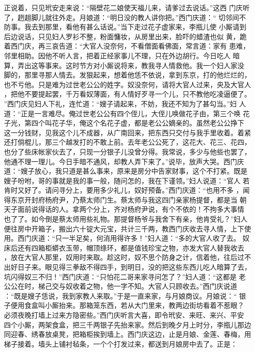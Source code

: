 正说着，只见玳安走来说：“隔壁花二娘使天福儿来，请爹过去说话。”这西
门庆听了，趔趄脚儿就往外走。月娘道：“明日没的教人讲你把。”西门庆道：“
切邻间不防事。我去到那里，看他有甚么话说。”当下走过花子虚家来，李瓶儿使
小厮请到后边说话，只见妇人罗衫不整，粉面慵妆，从房里出来，脸吓的蜡渣也似
黄，跪着西门庆，再三哀告道：“大官人没奈何，不看僧面看佛面，常言道：家有
患难，邻里相助。因他不听人言，把着正经家事儿不理，只在外边胡行。今日吃人
暗算，弄出这等事来。这时节方对小厮说将来，教我寻人情救他。我一个妇人家没
脚的，那里寻那人情去。发狠起来，想着他恁不依说，拿到东京，打的他烂烂的，
也不亏他。只是难为过世老公公的姓字。奴没奈何，请将大官人过来，央及大官人
，把他不要提起罢，千万看奴薄面，有人情好歹寻一个儿，只不教他吃凌逼便了。
”西门庆见妇人下礼，连忙道：“嫂子请起来，不妨，我还不知为了甚勾当。”妇
人道：“正是一言难尽。俺过世老公公有四个侄儿，大侄儿唤做花子由，第三个唤
花子光，第四个叫花子华，俺这个名花子虚，都是老公公嫡亲的。虽然老公公挣下
这一分钱财，见我这个儿不成器，从广南回来，把东西只交付与我手里收着。着紧
还打倘棍儿，那三个越发打的不敢上前。去年老公公死了，这花大、花三、花四，
也分了些床帐家伙去了，只现一分银子儿没曾分得。我常说，多少与他些也罢了，
他通不理一理儿。今日手暗不通风，却教人弄下来了。”说毕，放声大哭。西门庆
道：“嫂子放心，我只道是甚么事来，原来是房分中告家财事，这个不打紧。既是
嫂子吩咐，哥的事就是我的事一般，随问怎的，我在下谨领。”妇人说道：“官人
若肯时又好了。请问寻分上，要用多少礼儿，奴好预备。”西门庆道：“也用不多
，闻得东京开封府杨府尹，乃蔡太师门生。蔡太师与我这四门亲家杨提督，都是当
朝天子面前说得话的人。拿两个分上，齐对杨府尹说，有个不依的！不拘多大事情
也了了。如今倒是蔡太师用些礼物。那提督杨爷与我舍下有亲，他肯受礼？”妇人
便往房中开箱子，搬出六十锭大元宝，共计三千两，教西门庆收去寻人情，上下使
用。西门庆道：“只一半足矣，何消用得许多！”妇人道：“多的大官人收了去。
奴床后还有四箱柜蟒衣玉带，帽顶绦环，都是值钱珍宝之物，亦发大官人替我收去
，放在大官人那里，奴用时来取。趁这时，奴不思个防身之计，信着他，往后过不
出好日子来。眼见得三拳敌不得四手，到明日，没的把这些东西儿吃人暗算了去，
坑闪得奴三不归！”西门庆道：“只怕花二哥来家寻问怎了？”妇人道：“这都是
老公公在时，梯己交与奴收着之物，他一字不知。大官人只顾收去。”西门庆说道
：“既是嫂子恁说，我到家教人来取。”于是一直来家，与月娘商议。月娘说：“
银子便用食盒叫小厮抬来。那箱笼东西，若从大门里来，教两边街坊看着不惹眼？
必须夜晚打墙上过来方隐密些。”西门庆听言大喜，即令玳安、来旺、来兴、平安
四个小厮，两架食盒，把三千两银子先抬来家。然后到晚夕月上时分，李瓶儿那边
同迎春、绣春放桌凳，把箱柜挨到墙上。西门庆这边，止是月娘、金莲、春梅，用
梯子接着。墙头上铺衬毡条，一个个打发过来，都送到月娘房中去了。正是：

